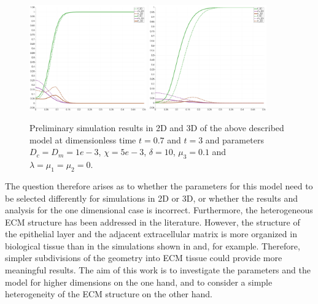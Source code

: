 \begin{figure}[!h]
 \includegraphics[width=0.45\textwidth]{y/anderson_tumor_invasion_model_2Dvs3Dtime0_7_thick.png}
 \includegraphics[width=0.45\textwidth]{y/anderson_tumor_invasion_model_2Dvs3D_time3_thick.png}
 \caption{Preliminary simulation results in 2D and 3D of the above described model at dimensionless time $t=0.7$ and $t=3$ and parameters $D_c=D_m=1e-3$, $\chi=5e-3$, $\delta=10$, $\mu_3=0.1$ and $\lambda=\mu_1=\mu_2 = 0$. }
 \label{fig:fig2}

\end{figure}
The question therefore arises as to whether the parameters for this model need to 
be selected differently for simulations in 2D or 3D, or whether the results and 
analysis for the one dimensional case is incorrect. \newline
Furthermore, the heterogeneous ECM structure has been addressed in the literature. 
However, the structure of the epithelial layer and the adjacent extracellular 
matrix is more organized in biological tissue than in the simulations shown in and, 
for example. Therefore, simpler subdivisions of the geometry into ECM tissue could 
provide more meaningful results. \newline
The aim of this work is to investigate the parameters and the model for higher 
dimensions on the one hand, and to consider a simple heterogeneity of the ECM 
structure on the other hand.